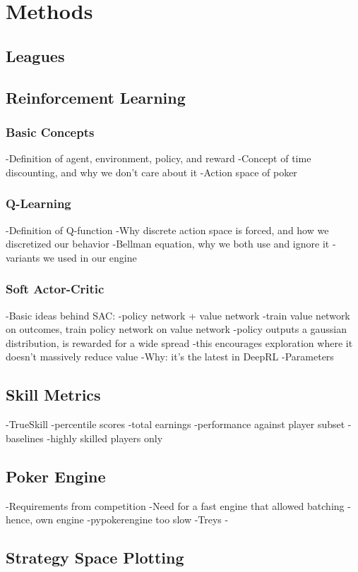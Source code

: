 \chapter{Methods}

\section{Leagues}

\section{Reinforcement Learning}
\subsection{Basic Concepts}
-Definition of agent, environment, policy, and reward
-Concept of time discounting, and why we don't care about it
-Action space of poker

\subsection{Q-Learning}
-Definition of Q-function
-Why discrete action space is forced, and how we discretized our behavior
-Bellman equation, why we both use and ignore it
-variants we used in our engine

\subsection{Soft Actor-Critic}
-Basic ideas behind SAC:
    -policy network + value network
    -train value network on outcomes, train policy network on value network
    -policy outputs a gaussian distribution, is rewarded for a wide spread
    -this encourages exploration where it doesn't massively reduce value
-Why: it's the latest in DeepRL
-Parameters

\section{Skill Metrics}
-TrueSkill
-percentile scores
-total earnings
-performance against player subset
    -baselines
    -highly skilled players only

\section{Poker Engine}
-Requirements from competition
-Need for a fast engine that allowed batching
    -hence, own engine
-pypokerengine too slow
-Treys
-
\section{Strategy Space Plotting}